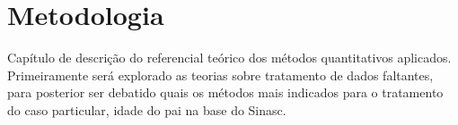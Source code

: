 \chapter{Metodologia}\label{metodo}



Capítulo de descrição do referencial teórico dos métodos quantitativos aplicados. Primeiramente será explorado as teorias sobre tratamento de dados faltantes, para posterior ser debatido quais os métodos mais indicados para o tratamento do caso particular, idade do pai na base do Sinasc.  

